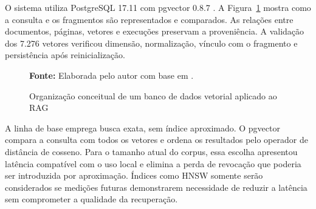 O sistema utiliza PostgreSQL 17.11 com pgvector 0.8.7 \cite{postgresql,pgvector}. A Figura~\ref{fig:banco-vetorial} mostra como a consulta e os fragmentos são representados e comparados. As relações entre documentos, páginas, vetores e execuções preservam a proveniência. A validação dos 7.276 vetores verificou dimensão, normalização, vínculo com o fragmento e persistência após reinicialização.

\begin{figure}[!htbp]
\centering
\begin{minipage}{0.96\textwidth}
\caption{Organização conceitual de um banco de dados vetorial aplicado ao RAG}
\label{fig:banco-vetorial}
\par\smallskip
{\footnotesize\raggedright\textbf{Fonte:} Elaborada pelo autor com base em \cite{pan2023vectordb}.\par}
\end{minipage}
\end{figure}

A linha de base emprega busca exata, sem índice aproximado. O pgvector compara a consulta com todos os vetores e ordena os resultados pelo operador de distância de cosseno. Para o tamanho atual do corpus, essa escolha apresentou latência compatível com o uso local e elimina a perda de revocação que poderia ser introduzida por aproximação. Índices como HNSW somente serão considerados se medições futuras demonstrarem necessidade de reduzir a latência sem comprometer a qualidade da recuperação.

